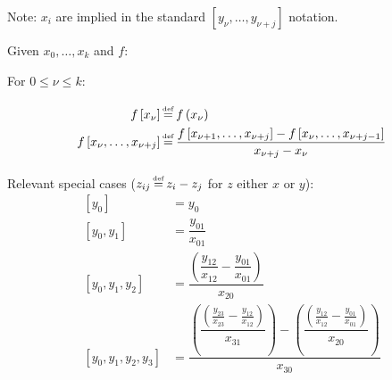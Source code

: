 Note: $x_i$ are implied in the standard 
$\left[ y_{\nu}, \ldots , y_{\nu + j} \right]$ notation.

Given $x_0, \ldots , x_k$ and $f$:

For $0 \leq \nu \leq k$:

\begin{align}
f \left[ x_{\nu} \right] & \operatorname*{\overset{\underset{\mathrm{def}}{}}{=}} f \left( x_{\nu} \right)
\\
f \left[ x_{\nu}, \ldots , x_{\nu + j} \right] & \operatorname*{\overset{\underset{\mathrm{def}}{}}{=}} 
\frac{
f \left[ x_{\nu + 1}, \ldots ,  x_{\nu + j} \right]
-
f \left[ x_{\nu}, \ldots ,  x_{\nu + j - 1} \right]
}{
x_{\nu + j} - x_{\nu}
} 
\nonumber
\end{align}

Relevant special cases ($z_{ij} \operatorname*{\overset{\underset{\mathrm{def}}{}}{=}} z_i - z_j$ for $z$ 
either $x$ or $y$): 
\begin{align}
\left[ y_0 \right] & = y_0 
\\
\left[ y_0 , y_1  \right] & = 
\dfrac{y_{01}}{x_{01}} 
\nonumber
\\
\left[ y_0 , y_1 , y_2 \right] & = 
\dfrac{
\left( \dfrac{y_{12}}{x_{12}} - \dfrac{y_{01}}{x_{01}} \right)
}{
x_{20}
} 
\nonumber
\\
\left[ y_0 , y_1 , y_2 , y_3 \right] & = 
\dfrac{
 \left(
 \dfrac{
 \left(
  \frac{y_{23}}{x_{23}} - \frac{y_{12}}{x_{12}}
  \right)
  }{x_{31}}
  \right)
 -
 \left(
 \dfrac{
 \left(
  \frac{y_{12}}{x_{12}} - \frac{y_{01}}{x_{01}}
  \right)
  }{x_{20}}
  \right)
}{
x_{30}
} 
\nonumber
\end{align}
